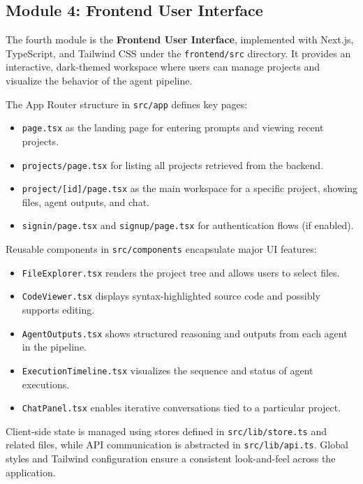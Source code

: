 \subsection{Module 4: Frontend User Interface}

The fourth module is the \textbf{Frontend User Interface}, implemented with Next.js, TypeScript, and Tailwind CSS under the \texttt{frontend/src} directory. It provides an interactive, dark-themed workspace where users can manage projects and visualize the behavior of the agent pipeline.

The App Router structure in \texttt{src/app} defines key pages:
\begin{itemize}
    \item \texttt{page.tsx} as the landing page for entering prompts and viewing recent projects.
    \item \texttt{projects/page.tsx} for listing all projects retrieved from the backend.
    \item \texttt{project/[id]/page.tsx} as the main workspace for a specific project, showing files, agent outputs, and chat.
    \item \texttt{signin/page.tsx} and \texttt{signup/page.tsx} for authentication flows (if enabled).
\end{itemize}

Reusable components in \texttt{src/components} encapsulate major UI features:
\begin{itemize}
    \item \texttt{FileExplorer.tsx} renders the project tree and allows users to select files.
    \item \texttt{CodeViewer.tsx} displays syntax-highlighted source code and possibly supports editing.
    \item \texttt{AgentOutputs.tsx} shows structured reasoning and outputs from each agent in the pipeline.
    \item \texttt{ExecutionTimeline.tsx} visualizes the sequence and status of agent executions.
    \item \texttt{ChatPanel.tsx} enables iterative conversations tied to a particular project.
\end{itemize}

Client-side state is managed using stores defined in \texttt{src/lib/store.ts} and related files, while API communication is abstracted in \texttt{src/lib/api.ts}. Global styles and Tailwind configuration ensure a consistent look-and-feel across the application.

